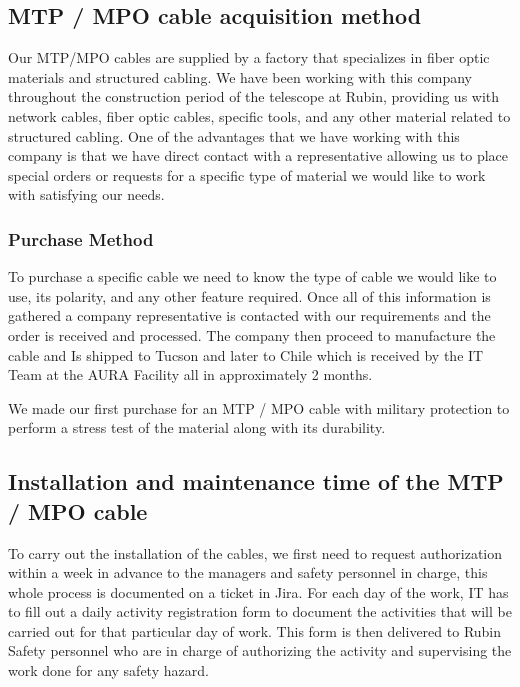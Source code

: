 \subsection{MTP / MPO cable acquisition method}


Our MTP/MPO cables are supplied by a factory that specializes in fiber optic materials and structured cabling. We have been working with this company throughout the construction period of the telescope at Rubin, providing us with network cables, fiber optic cables, specific tools, and any other material related to structured cabling. One of the advantages that we have working with this company is that we have direct contact with a representative allowing us to place special orders or requests for a specific type of material we would like to work with satisfying our needs.


\subsubsection{Purchase Method}

To purchase a specific cable we need to know the type of cable we would like to use, its polarity, and any other feature required. Once all of this information is gathered a company representative is contacted with our requirements and the order is received and processed. The company then proceed to manufacture the cable and Is shipped to Tucson and later to Chile which is received by the IT Team at the AURA Facility all in approximately 2 months.

We made our first purchase for an MTP / MPO cable with military protection to perform a stress test of the material along with its durability.

\subsection{Installation and maintenance time of the MTP / MPO cable}

To carry out the installation of the cables, we first need to request authorization within a week in advance to the managers and safety personnel in charge, this whole process is documented on a ticket in Jira. For each day of the work, IT has to fill out a daily activity registration form to document the activities that will be carried out for that particular day of work. This form is then delivered to Rubin Safety personnel who are in charge of authorizing the activity and supervising the work done for any safety hazard.

